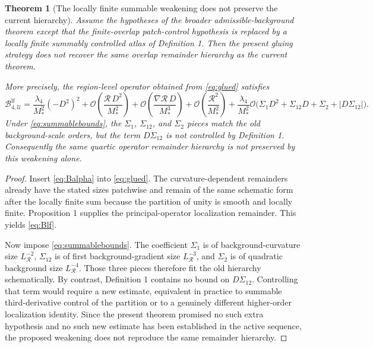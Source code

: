 \documentclass[11pt]{article}
\newtheorem{theorem}{Theorem}
\begin{document}
\begin{theorem}[The locally finite summable weakening does not preserve the current hierarchy]
Assume the hypotheses of the broader admissible-background theorem except that the finite-overlap patch-control hypothesis is replaced by a locally finite summably controlled atlas of Definition 1. Then the present gluing strategy does not recover the same overlap remainder hierarchy as the current theorem.

More precisely, the region-level operator obtained from \eqref{eq:glued} satisfies
\begin{equation}
\mathcal B_{4,\mathcal U}^{\mathrm{lf}}
=
\frac{\lambda_4}{M_*^2}(-D^2)^2
+ \mathcal O\!\left(\frac{\mathcal R\,D^2}{M_*^2}\right)
+ \mathcal O\!\left(\frac{\nabla\mathcal R\,D}{M_*^3}\right)
+ \mathcal O\!\left(\frac{\mathcal R^2}{M_*^2}\right)
+ \frac{\lambda_4}{M_*^2}\mathcal O\!\bigl(\Sigma_1 D^2 + \Sigma_{12} D + \Sigma_2 + |D\Sigma_{12}|\bigr).
\label{eq:Blf}
\end{equation}
Under \eqref{eq:summablebounds}, the \(\Sigma_1\), \(\Sigma_{12}\), and \(\Sigma_2\) pieces match the old background-scale orders, but the term \(D\Sigma_{12}\) is not controlled by Definition 1. Consequently the same quartic operator remainder hierarchy is not preserved by this weakening alone.
\end{theorem}

\begin{proof}
Insert \eqref{eq:Balpha} into \eqref{eq:glued}. The curvature-dependent remainders already have the stated sizes patchwise and remain of the same schematic form after the locally finite sum because the partition of unity is smooth and locally finite. Proposition 1 supplies the principal-operator localization remainder. This yields \eqref{eq:Blf}.

Now impose \eqref{eq:summablebounds}. The coefficient \(\Sigma_1\) is of background-curvature size \(L_{\mathcal R}^{-2}\), \(\Sigma_{12}\) is of first background-gradient size \(L_{\mathcal R}^{-3}\), and \(\Sigma_2\) is of quadratic background size \(L_{\mathcal R}^{-4}\). Those three pieces therefore fit the old hierarchy schematically. By contrast, Definition 1 contains no bound on \(D\Sigma_{12}\). Controlling that term would require a new estimate, equivalent in practice to summable third-derivative control of the partition or to a genuinely different higher-order localization identity. Since the present theorem promised no such extra hypothesis and no such new estimate has been established in the active sequence, the proposed weakening does not reproduce the same remainder hierarchy.
\end{proof}
\end{document}

